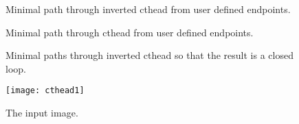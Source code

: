 \documentclass{InsightArticle}
\begin{document}
\begin{figure}[htbp]
\begin{center}
\caption{Minimal path through inverted cthead from user defined endpoints.\label{fig:basicPath}}
\end{center}
\end{figure}

\begin{figure}[htbp]
\begin{center}
\caption{Minimal path through cthead from user defined endpoints.\label{fig:basicPathB}}
\end{center}
\end{figure}

\begin{figure}[htbp]
\begin{center}
\caption{Minimal paths through inverted cthead so that the result is a closed loop.\label{fig:basicPathM}}
\end{center}
\end{figure}


\begin{figure}[htbp]
\centering
\texttt{[image: cthead1]}
\caption{The input image.\label{cthead1}}
\end{figure}







\nocite{ITKSoftwareGuide}
\end{document}
